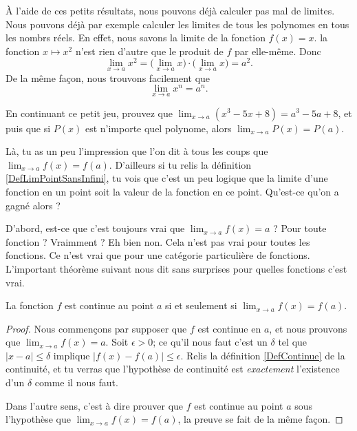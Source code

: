 À l'aide de ces petits résultats, nous pouvons déjà calculer pas mal de limites. Nous pouvons déjà par exemple calculer les limites de tous les polynomes en tous les nombrs réels. En effet, nous savons la limite de la fonction $f(x)=x$. la fonction $x\mapsto x^2$ n'est rien d'autre que le produit de $f$ par elle-même. Donc
\[ 
  \lim_{x\to a}x^2=\big( \lim_{x\to a}x\big)\cdot\big( \lim_{x\to a}x \big)=a^2.
\]
De la même façon, nous trouvons facilement que 
\begin{equation}
 \lim_{x\to a}x^n=a^n.
\end{equation}

\begin{exercice}
En continuant ce petit jeu, prouvez que $\lim_{x\to a}(x^3-5x+8)=a^3-5a+8$, et puis que si $P(x)$ est n'importe quel polynome, alors $\lim_{x\to a}P(x)=P(a)$.
\end{exercice}

Là, tu as un peu l'impression que l'on dit à tous les coups que $\lim_{x\to a}f(x)=f(a)$. D'ailleurs si tu relis la définition \ref{DefLimPointSansInfini}, tu vois que c'est un peu logique que la limite d'une fonction en un point soit la valeur de la fonction en ce point. Qu'est-ce qu'on a gagné alors ?

D'abord, est-ce que c'est toujours vrai que $\lim_{x\to a}f(x)=a$ ? Pour toute fonction ? Vraimment ? Eh bien non. Cela n'est pas vrai pour toutes les fonctions. Ce n'est vrai que pour une catégorie particulière de fonctions. L'important théorème suivant nous dit sans surprises pour quelles fonctions c'est vrai.

\begin{theorem}			\label{ThoLimCont}
La fonction $f$ est continue au point $a$ si et seulement si $\lim_{x\to a}f(x)=f(a)$.
\end{theorem}

\begin{proof}
Nous commençons par supposer que $f$ est continue en $a$, et nous prouvons que $\lim_{x\to a}f(x)=a$. Soit $\epsilon>0$; ce qu'il nous faut c'est un $\delta$ tel que $| x-a |\leq\delta$ implique $| f(x)-f(a) |\leq\epsilon$. Relis la définition \ref{DefContinue} de la continuité, et tu verras que l'hypothèse de continuité est \emph{exactement} l'existence d'un $\delta$ comme il nous faut.

Dans l'autre sens, c'est à dire prouver que $f$ est continue au point $a$ sous l'hypothèse que $\lim_{x\to a}f(x)=f(a)$, la preuve se fait de la même façon.
\end{proof}

